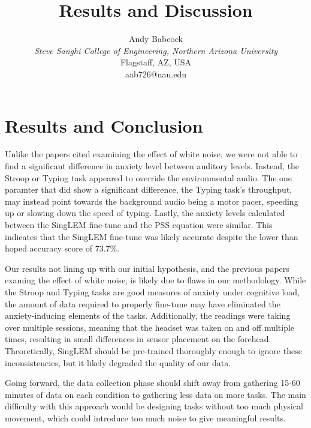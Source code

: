 \documentclass[journal]{IEEEtran}
\begin{document}
\title{Results and Discussion}

\author{Andy Babcock \\
    \textit{Steve Sanghi College of Engineering, Northern Arizona University} \\
    Flagstaff, AZ, USA \\
    aab726@nau.edu
}

\maketitle


\section{Results and Conclusion}
Unlike the papers cited examining the effect of white noise, we were not able to find a significant difference in anxiety level between auditory levels. Instead, the Stroop or Typing task appeared to override the environmental audio. The one paramter that did show a significant difference, the Typing task's throughput, may instead point towards the background audio being a motor pacer, speeding up or slowing down the speed of typing. Lastly, the anxiety levels calculated between the SingLEM fine-tune and the PSS equation were similar. This indicates that the SingLEM fine-tune was likely accurate despite the lower than hoped accuracy score of 73.7\%.

Our results not lining up with our initial hypothesis, and the previous papers examing the effect of white noise, is likely due to flaws in our methodology. While the Stroop and Typing tasks are good measures of anxiety under cognitive load, the amount of data required to properly fine-tune may have eliminated the anxiety-inducing elements of the tasks. Additionally, the readings were taking over multiple sessions, meaning that the headset was taken on and off multiple times, resulting in small differences in sensor placement on the forehead. Theoretically, SingLEM should be pre-trained thoroughly enough to ignore these inconsistencies, but it likely degraded the quality of our data.

Going forward, the data collection phase should shift away from gathering 15-60 minutes of data on each condition to gathering less data on more tasks. The main difficulty with this approach would be designing tasks without too much physical movement, which could introduce too much noise to give meaningful results.
\end{document}
